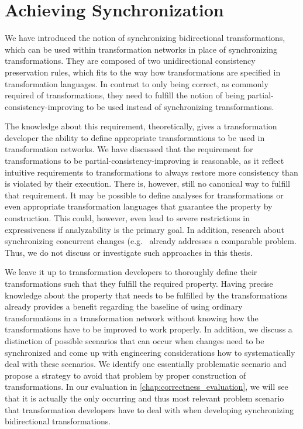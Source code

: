 \section{Achieving Synchronization} %
\label{chap:synchronization:achieving}

We have introduced the notion of synchronizing bidirectional transformations, which can be used within transformation networks in place of synchronizing transformations.
They are composed of two unidirectional consistency preservation rules, which fits to the way how transformations are specified in transformation languages.
In contrast to only being correct, as commonly required of transformations, they need to fulfill the notion of being partial-consistency-improving to be used instead of synchronizing transformations.

The knowledge about this requirement, theoretically, gives a transformation developer the ability to define appropriate transformations to be used in transformation networks.
We have discussed that the requirement for transformations to be partial-consistency-improving is reasonable, as it reflect intuitive requirements to transformations to always restore more consistency than is violated by their execution.
There is, however, still no canonical way to fulfill that requirement.
It may be possible to define analyses for transformations or even appropriate transformation languages that guarantee the property by construction.
This could, however, even lead to severe restrictions in expressiveness if analyzability is the primary goal.
In addition, research about synchronizing concurrent changes (e.g.~\cite{hermann2012concurrentSynchronization-FASE,orejas2020IncrementalConcurrentSynchronization-FASE,xiong2013SynchronizingConcurrentUpdates-SoSym,xiong2009parallelUpdates-ICMT} already addresses a comparable problem.
Thus, we do not discuss or investigate such approaches in this thesis.

We leave it up to transformation developers to thoroughly define their transformations such that they fulfill the required property.
Having precise knowledge about the property that needs to be fulfilled by the transformations already provides a benefit regarding the baseline of using ordinary transformations in a transformation network without knowing how the transformations have to be improved to work properly.
In addition, we discuss a distinction of possible scenarios that can occur when changes need to be synchronized and come up with engineering considerations how to systematically deal with these scenarios.
We identify one essentially problematic scenario and propose a strategy to avoid that problem by proper construction of transformations.
In our evaluation in \autoref{chap:correctness_evaluation}, we will see that it is actually the only occurring and thus most relevant problem scenario that transformation developers have to deal with when developing synchronizing bidirectional transformations.


